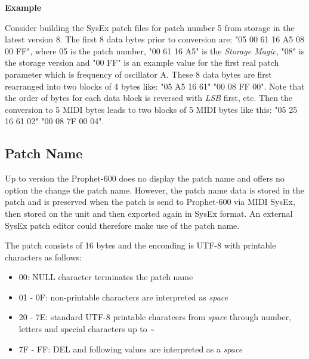 \textbf{Example}

Consider building the SysEx patch files for patch number 5 from storage in the latest version 8. The first 8 data bytes prior to conversion are: "05 00 61 16 A5 08 00 FF", where 05 is the patch number, "00 61 16 A5" is the \textit{Storage Magic}, "08" is the storage version and "00 FF" is an example value for the first real patch parameter which is frequency of oscillator A. These 8 data bytes are first rearranged into two blocks of 4 bytes like: "05 A5 16 61" "00 08 FF 00". Note that the order of bytes for each data block is reversed with \textit{LSB} first, etc. Then the conversion to 5 MIDI bytes leads to two blocks of 5 MIDI bytes like this: "05 25 16 61 02" "00 08 7F 00 04".


\subsection{Patch Name}

Up to version \version the Prophet-600 does no display the patch name and offers no option the change the patch name. However, the patch name data is stored in the patch and is preserved when the patch is send to Prophet-600 via MIDI SysEx, then stored on the unit and then exported again in SysEx format. An external SysEx patch editor could therefore make use of the patch name.

The patch consists of 16 bytes and the enconding is UTF-8 with printable characters as follows:

\begin{itemize}
  \item 00: NULL character terminates the patch name
  \item 01 - 0F: non-printable characters are interpreted as \textit{space}
  \item 20 - 7E: standard UTF-8 printable charatcers from \textit{space} through number, letters and special characters up to \textasciitilde
  \item 7F - FF: DEL and following values are interpreted as a \textit{space}
\end{itemize}
 
